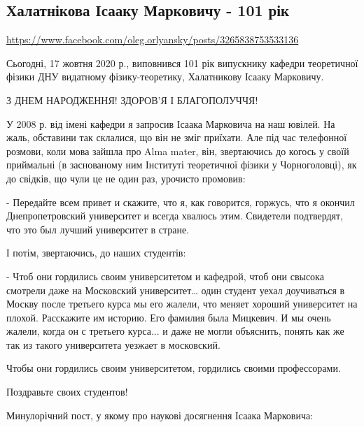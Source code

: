  
 

\subsection{Халатнікова Ісааку Марковичу - 101 рік}
\label{sec:17_10_2020.fb.oleg_orljanskii.halatnikov}

\url{https://www.facebook.com/oleg.orlyansky/posts/3265838753533136}


Сьогодні, 17 жовтня 2020 р., виповнився 101 рік випускнику кафедри теоретичної
фізики ДНУ видатному фізику-теоретику, Халатникову Ісааку Марковичу.

З ДНЕМ НАРОДЖЕННЯ! ЗДОРОВ’Я І БЛАГОПОЛУЧЧЯ! 

У 2008 р. від імені кафедри я запросив Ісаака Марковича на наш ювілей. На жаль,
обставини так склалися, що він не зміг приїхати. Але під час телефонної
розмови, коли мова зайшла про Alma mater, він, звертаючись до когось у своїй
приймальні (в заснованому ним Інституті теоретичної фізики у Чорноголовці), як
до свідків, що чули це не один раз, урочисто промовив:

- Передайте всем привет и скажите, что я, как говорится, горжусь, что я окончил
Днепропетровский университет и всегда хвалюсь этим. Свидетели подтвердят, что
это был лучший университет в стране.

І потім, звертаючись, до наших студентів:

- Чтоб они гордились своим университетом и кафедрой, чтоб они свысока смотрели
даже на Московский университет… один студент уехал доучиваться в Москву после
третьего курса мы его жалели, что меняет хороший университет на плохой.
Расскажите им историю. Его фамилия была Мицкевич. И мы очень жалели, когда он с
третьего курса... и даже не могли объяснить, понять как же так из такого
университета уезжает в московский.

Чтобы они гордились своим университетом, гордились своими профессорами.

Поздравьте своих студентов!

Минулорічний пост, у якому  про наукові досягнення Ісаака Марковича:

